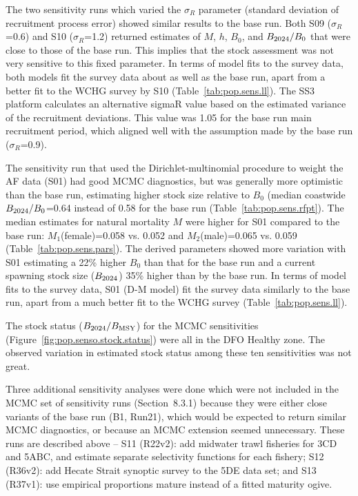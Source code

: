 \documentclass[11pt]{book}
\newcommand{\Bmsy}{B_\text{MSY}}
\newcommand{\pc}{\%}
\begin{document}
The two sensitivity runs which varied the $\sigma_R$ parameter (standard deviation of recruitment process error) showed similar results to the base run. 
Both S09 ($\sigma_R$=0.6) and S10 ($\sigma_R$=1.2) returned estimates of $M$, $h$, $B_0$, and $B_{2024}/B_0$ that were close to those of the base run. 
This implies that the stock assessment was not very sensitive to this fixed parameter.
In terms of model fits to the survey data, both models fit the survey data about as well as the base run, apart from a better fit to the WCHG survey by S10 (Table~\ref{tab:pop.sens.ll}).
The SS3 platform calculates an alternative sigmaR value based on the estimated variance of the recruitment deviations.
This value was 1.05 for the base run main recruitment period, which aligned well with the assumption made by the base run ($\sigma_R$=0.9).

The sensitivity run that used the Dirichlet-multinomial procedure to weight the AF data (S01) had good MCMC diagnostics, but was generally more optimistic than the base run, estimating higher stock size relative to $B_0$ (median coastwide $B_{2024}/B_0$=0.64 instead of 0.58 for the base run (Table~\ref{tab:pop.sens.rfpt}).
The median estimates for natural mortality $M$ were higher for S01 compared to the base run: $M_1$(female)=0.058 vs. 0.052 and $M_2$(male)=0.065 vs. 0.059 (Table~\ref{tab:pop.sens.pars}). 
The derived parameters showed more variation with S01 estimating a 22\pc{} higher $B_0$ than that for the base run and a current spawning stock size ($B_{2024}$) 35\pc{} higher than by the base run. 
In terms of model fits to the survey data, S01 (D-M model) fit the survey data similarly to the base run, apart from a much better fit to the WCHG survey (Table~\ref{tab:pop.sens.ll}).

The stock status ($\Bcurr/\Bmsy$) for the MCMC sensitivities (Figure~\ref{fig:pop.senso.stock.status}) were all in the DFO Healthy zone.
The observed variation in estimated stock status among these ten sensitivities was not great.

Three additional sensitivity analyses were done which were not included in the MCMC set of sensitivity runs (Section~8.3.1) because they were either close variants of the base run (B1, Run21), which would be expected to return similar MCMC diagnostics, or because an MCMC extension seemed unnecessary.
These runs are described above -- S11 (R22v2): add midwater trawl fisheries for 3CD and 5ABC, and estimate separate selectivity functions for each fishery; S12 (R36v2): add Hecate Strait synoptic survey to the 5DE data set; and S13 (R37v1): use empirical proportions mature instead of a fitted maturity ogive.
\end{document}
